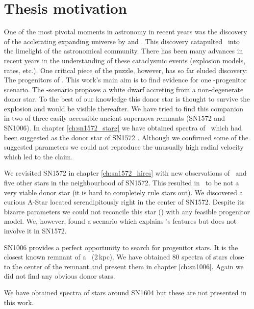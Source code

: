 \newpage
\section{Thesis motivation}
One of the most pivotal moments in astronomy in recent years was the discovery of the acclerating expanding universe by \citet{1998AJ....116.1009R} and \citet{1999ApJ...517..565P}. This discovery catapulted \sneia\ into the limelight of the astronomical community. There has been many advances in recent years in the understanding of these cataclysmic events (explosion models, rates, etc.). One critical piece of the puzzle, however, has so far eluded discovery: The progenitors of \sneia. This work's main aim is to find evidence for one \snia-progenitor scenario. The \sd-scenario proposes a white dwarf accreting from a non-degenerate donor star. To the best of our knowledge this donor star is thought to survive the explosion and would be visible thereafter. We have tried to find this companion in two of three easily accessible ancient supernova remnants (SN1572 and SN1006). 
In chapter \ref{ch:sn1572_starg} we have obtained spectra of \starg\ which had been suggested as the donor star of SN1572 \citep{2004Natur.431.1069R}. Although we confirmed some of the suggested parameters we could not reproduce the unusually high radial velocity which led to the claim. 

We revisited SN1572 in chapter \ref{ch:sn1572_hires} with new observations of \starg\ and five other stars in the neighbourhood of SN1572. This resulted in \starg\ to be not a very viable donor star (it is hard to completely rule stars out). We discovered a curious A-Star located serendipitously right in the center of SN1572. Despite its bizarre parameters we could not reconcile this star (\starb) with any feasible progenitor model. We, however, found a scenario which explains \starb's features but does not involve it in SN1572. 

SN1006 provides a perfect opportunity to search for progenitor stars. It is the closest known remnant of a \snia\ (2\,kpc). We have obtained 80 spectra of stars close to the center of the remnant and present them in chapter \ref{ch:sn1006}. Again we did not find any obvious donor stars. 

We have obtained spectra of stars around SN1604 but these are not presented in this work.

